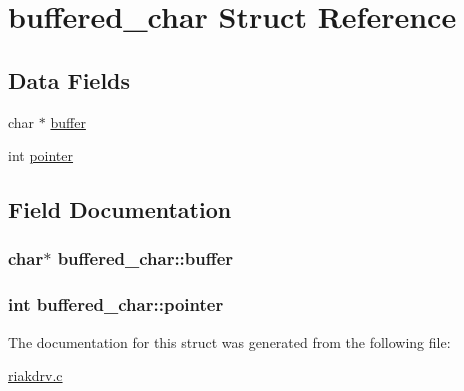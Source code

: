 \hypertarget{structbuffered__char}{
\section{buffered\_\-char Struct Reference}
\label{structbuffered__char}
}
\subsection*{Data Fields}
\begin{DoxyCompactItemize}
\item 
char $\ast$ \hyperlink{structbuffered__char_a759de684707699359a0c31d5e125f6a0}{buffer}
\item 
int \hyperlink{structbuffered__char_a2f7425884f415035f4dcd8340e9600b4}{pointer}
\end{DoxyCompactItemize}


\subsection{Field Documentation}
\hypertarget{structbuffered__char_a759de684707699359a0c31d5e125f6a0}{
\subsubsection[{buffer}]{\setlength{\rightskip}{0pt plus 5cm}char$\ast$ {\bf buffered\_\-char::buffer}}}
\label{structbuffered__char_a759de684707699359a0c31d5e125f6a0}
\hypertarget{structbuffered__char_a2f7425884f415035f4dcd8340e9600b4}{
\subsubsection[{pointer}]{\setlength{\rightskip}{0pt plus 5cm}int {\bf buffered\_\-char::pointer}}}
\label{structbuffered__char_a2f7425884f415035f4dcd8340e9600b4}


The documentation for this struct was generated from the following file:\begin{DoxyCompactItemize}
\item 
\hyperlink{riakdrv_8c}{riakdrv.c}\end{DoxyCompactItemize}
